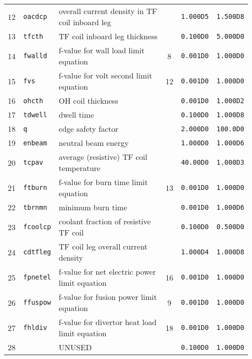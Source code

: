 \documentclass[11pt,a4paper]{report}
\begin{document}
\begin{table}[tbph]
\begin{center}
\begin{tabular}{||c|l|l|c|c|c||}
12  & \texttt{oacdcp}   & overall current density in TF coil inboard leg&     & \texttt{1.000D5} & \texttt{1.500D8} \\
13  & \texttt{tfcth}    & TF coil inboard leg thickness                 &     & \texttt{0.100D0} & \texttt{5.000D0} \\
14  & \texttt{fwalld}   & f-value for wall load limit equation          & 8   & \texttt{0.001D0} & \texttt{1.000D0} \\
15  & \texttt{fvs}      & f-value for volt second limit equation        & 12  & \texttt{0.001D0} & \texttt{1.000D0} \\
16  & \texttt{ohcth}    & OH coil thickness                             &     & \texttt{0.001D0} & \texttt{1.000D2} \\
17  & \texttt{tdwell}   & dwell time                                    &     & \texttt{0.100D0} & \texttt{1.000D8} \\
18  & \texttt{q}        & edge safety factor                            &     & \texttt{2.000D0} & \texttt{100.0D0} \\
19  & \texttt{enbeam}   & neutral beam energy                           &     & \texttt{1.000D0} & \texttt{1.000D6} \\
20  & \texttt{tcpav}    & average (resistive) TF coil temperature       &     & \texttt{40.00D0} & \texttt{1.000D3} \\
21  & \texttt{ftburn}   & f-value for burn time limit equation          & 13  & \texttt{0.001D0} & \texttt{1.000D0} \\
22  & \texttt{tbrnmn}   & minimum burn time                             &     & \texttt{0.001D0} & \texttt{1.000D6} \\
23  & \texttt{fcoolcp}  & coolant fraction of resistive TF coil         &     & \texttt{0.100D0} & \texttt{0.500D0} \\
24  & \texttt{cdtfleg}  & TF coil leg overall current density           &     & \texttt{1.000D4} & \texttt{1.000D8} \\
25  & \texttt{fpnetel}  & f-value for net electric power limit equation & 16  & \texttt{0.001D0} & \texttt{1.000D0} \\
26  & \texttt{ffuspow}  & f-value for fusion power limit equation       & 9   & \texttt{0.001D0} & \texttt{1.000D0} \\
27  & \texttt{fhldiv}   & f-value for divertor heat load limit equation & 18  & \texttt{0.001D0} & \texttt{1.000D0} \\
28  &                   & UNUSED                                        &     & \texttt{0.100D0} & \texttt{1.000D0} \\

\end{tabular}
\end{center}
\end{table}
\end{document}

